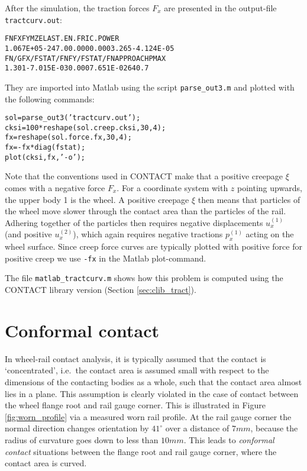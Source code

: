 \documentclass[12pt]{report}
\begin{document}
After the simulation, the traction forces $F_x$ are presented in
the output-file {\tt tractcurv.out}:
\begin{alltt}\small
     FN          FX          FY          MZ         ELAST.EN.   FRIC.POWER
     1.067E+05      -247.0       0.000       0.000       3.265  -4.124E-05
     FN/G      FX/FSTAT/FN  FY/FSTAT/FN  APPROACH     PMAX    
         1.301  -7.015E-03       0.000   7.651E-02       640.7
\end{alltt}
They are imported into Matlab using the script {\tt parse\_out3.m} and
plotted with the following commands:
\begin{alltt}\small
   sol  = parse_out3('tractcurv.out');
   cksi = 100 * reshape(sol.creep.cksi, 30, 4);
   fx   =       reshape(sol.force.fx, 30, 4);
   fx   = -fx * diag(fstat);
   plot(cksi, fx, '-o');
\end{alltt}
Note that the conventions used in CONTACT make that a positive creepage
$\xi$ comes with a negative force $F_x$. For a coordinate system with $z$
pointing upwards, the upper body 1 is the wheel. A positive creepage $\xi$
then means that particles of the wheel move slower through the contact area
than the particles of the rail. Adhering together of the particles then
requires negative displacements $u^{(1)}_x$ (and positive $u^{(2)}_x$), which
again requires negative tractions $p^{(1)}_x$ acting on the wheel surface.
Since creep force curves are typically plotted with positive force for
positive creep we use {\tt -fx} in the Matlab plot-command.

The file {\tt matlab\_tractcurv.m} shows how this problem is computed
using the CONTACT library version (Section \ref{sec:clib_tract}).

\section{Conformal contact}
\label{sec:ex_conformal}

In wheel-rail contact analysis, it is typically assumed that the contact is
`concentrated', i.e.\ the contact area is assumed small with respect to
the dimensions of the contacting bodies as a whole, such that the contact
area almost lies in a plane. This
assumption is clearly violated in the case of contact between the wheel
flange root and rail gauge corner. This is illustrated in Figure
\ref{fig:worn_profile} via a measured worn rail profile. At the rail
gauge corner the normal direction changes orientation by $41^\circ$ over a
distance of $7\unit{mm}$, because the radius of curvature goes down to less than
$10\unit{mm}$. This leads to {\em conformal contact\/} situations between the
flange root and rail gauge corner, where the contact area is curved.
\end{document}
